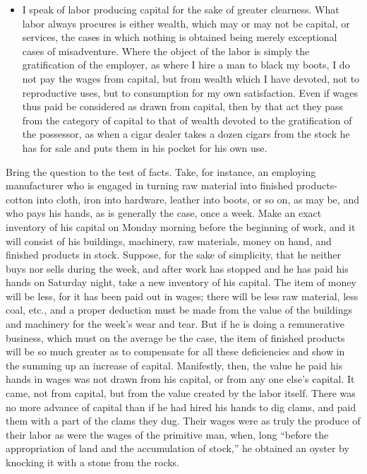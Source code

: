 \begin{itemize}
\tightlist
\item
  I speak of labor producing capital for the sake of greater clearness.
  What labor always procures is either wealth, which may or may not be
  capital, or services, the cases in which nothing is obtained being
  merely exceptional cases of misadventure. Where the object of the
  labor is simply the gratification of the employer, as where I hire a
  man to black my boots, I do not pay the wages from capital, but from
  wealth which I have devoted, not to reproductive uses, but to
  consumption for my own satisfaction. Even if wages thus paid be
  considered as drawn from capital, then by that act they pass from the
  category of capital to that of wealth devoted to the gratification of
  the possessor, as when a cigar dealer takes a dozen cigars from the
  stock he has for sale and puts them in his pocket for his own use.
\end{itemize}

Bring the question to the test of facts. Take, for instance, an
employing manufacturer who is engaged in turning raw material into
finished products-cotton into cloth, iron into hardware, leather into
boots, or so on, as may be, and who pays his hands, as is generally the
case, once a week. Make an exact inventory of his capital on Monday
morning before the beginning of work, and it will consist of his
buildings, machinery, raw materials, money on hand, and finished
products in stock. Suppose, for the sake of simplicity, that he neither
buys nor sells during the week, and after work has stopped and he has
paid his hands on Saturday night, take a new inventory of his capital.
The item of money will be less, for it has been paid out in wages; there
will be less raw material, less coal, etc., and a proper deduction must
be made from the value of the buildings and machinery for the week's
wear and tear. But if he is doing a remunerative business, which must on
the average be the case, the item of finished products will be so much
greater as to compensate for all these deficiencies and show in the
summing up an increase of capital. Manifestly, then, the value he paid
his hands in wages was not drawn from his capital, or from any one
else's capital. It came, not from capital, but from the value created by
the labor itself. There was no more advance of capital than if he had
hired his hands to dig clams, and paid them with a part of the clams
they dug. Their wages were as truly the produce of their labor as were
the wages of the primitive man, when, long ``before the appropriation of
land and the accumulation of stock,'' he obtained an oyster by knocking
it with a stone from the rocks.

